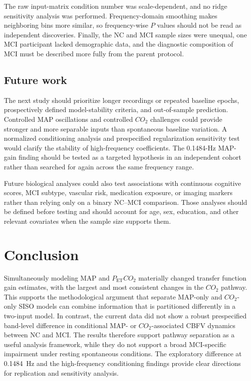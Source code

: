 \documentclass[12pt]{article}
\newcommand{\PETCOtwo}{P_{\mathrm{ET}}CO_2}
\newcommand{\COtwo}{CO_2}
\begin{document}
The raw input-matrix condition number was scale-dependent, and no ridge
sensitivity analysis was performed. Frequency-domain smoothing makes
neighboring bins more similar, so frequency-wise $P$ values should not be read
as independent discoveries. Finally, the NC and MCI sample sizes were unequal,
one MCI participant lacked demographic data, and the diagnostic composition
of MCI must be described more fully from the parent protocol.

\subsection{Future work}

The next study should prioritize longer recordings or repeated baseline
epochs, prospectively defined model-stability criteria, and out-of-sample
prediction. Controlled MAP oscillations and controlled $\COtwo$ challenges
could provide stronger and more separable inputs than spontaneous baseline
variation. A normalized conditioning analysis and prespecified regularization
sensitivity test would clarify the stability of high-frequency coefficients.
The 0.1484-Hz MAP-gain finding should be tested as a targeted hypothesis in an
independent cohort rather than searched for again across the same frequency
range.

Future biological analyses could also test associations with continuous
cognitive scores, MCI subtype, vascular risk, medication exposure, or imaging
markers rather than relying only on a binary NC--MCI comparison. Those analyses
should be defined before testing and should account for age, sex, education,
and other relevant covariates when the sample size supports them.

\section{Conclusion}

Simultaneously modeling MAP and $\PETCOtwo$ materially changed transfer
function gain estimates, with the largest and most consistent changes in the
$\COtwo$ pathway. This supports the methodological argument that separate
MAP-only and $\COtwo$-only SISO models can combine information that is
partitioned differently in a two-input model. In contrast, the current data
did not show a robust prespecified band-level difference in conditional MAP-
or $\COtwo$-associated CBFV dynamics between NC and MCI. The results therefore
support pathway separation as a useful analysis framework, while they do not
support a broad MCI-specific impairment under resting spontaneous conditions.
The exploratory difference at 0.1484~Hz and the high-frequency conditioning
findings provide clear directions for replication and sensitivity analysis.
\end{document}
